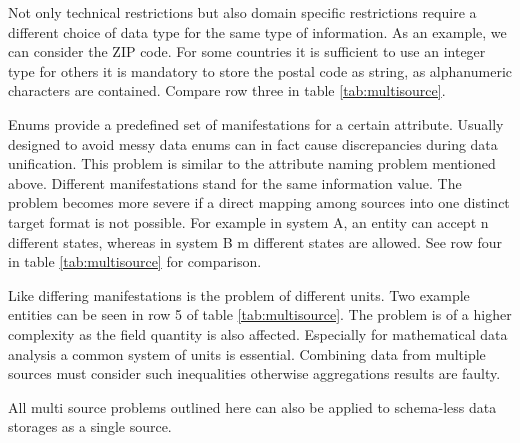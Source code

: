 Not only technical restrictions but also domain specific restrictions require a different choice of data type for the same type of information. As an example, we can consider the ZIP code. For some countries it is sufficient to use an integer type for others it is mandatory to store the postal code as string, as alphanumeric characters are contained. Compare row three in table \ref{tab:multisource}. 

Enums provide a predefined set of manifestations for a certain attribute. Usually designed to avoid messy data enums can in fact cause discrepancies during data unification. This problem is similar to the attribute naming problem mentioned above. Different manifestations stand for the same information value. The problem becomes more severe if a direct mapping among sources into one distinct target format is not possible. For example in system A, an entity can accept n different states, whereas in system B m different states are allowed. See row four in table \ref{tab:multisource} for comparison.

Like differing manifestations is the problem of different units. Two example entities can be seen in row 5 of table \ref{tab:multisource}. The problem is of a higher complexity as the field quantity is also affected. Especially for mathematical data analysis a common system of units is essential. Combining data from multiple sources must consider such inequalities otherwise aggregations results are faulty.

All multi source problems outlined here can also be applied to schema-less data storages as a single source. 

